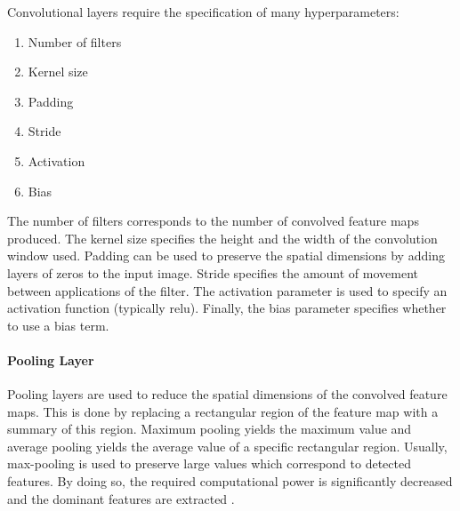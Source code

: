 Convolutional layers require the specification of many hyperparameters:
\begin{enumerate}
  \item Number of filters
  \item Kernel size
  \item Padding
  \item Stride
  \item Activation
  \item Bias
\end{enumerate}

The number of filters corresponds to the number of convolved feature maps produced.
The kernel size specifies the height and the width of the convolution window used.
Padding can be used to preserve the spatial dimensions by adding layers of zeros to the input image.
Stride specifies the amount of movement between applications of the filter.
The activation parameter is used to specify an activation function (typically \acrshort{relu}).
Finally, the bias parameter specifies whether to use a bias term.


\paragraph{Pooling Layer}
Pooling layers are used to reduce the spatial dimensions of the convolved feature maps.
This is done by replacing a rectangular region of the feature map with a summary of this region.
Maximum pooling yields the maximum value and average pooling yields the average value of a specific rectangular region.
Usually, max-pooling is used to preserve large values which correspond to detected features.
By doing so, the required computational power is significantly decreased and the dominant features are extracted \cite[p.~335--339]{deeplearningbook}.

